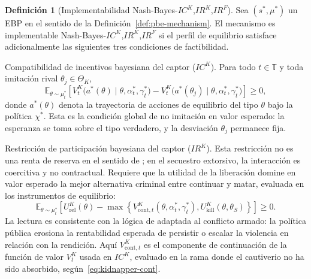 \documentclass[review,authoryear,12pt]{elsarticle}
\providecommand{\textcite}{\citet}
\theoremstyle{plain}
\theoremstyle{definition}
\newtheorem{definition}[theorem]{Definición}
\newcommand{\ThetaK}{\Theta_K}
\newcommand{\1}{\mathbf{1}}
\begin{document}
\begin{definition}[Implementabilidad Nash-Bayes-$IC^K$,$IR^K$,$IR^F$]
\label{def:implementable-mechanism}
Sea $(s^\ast,\mu^\ast)$ un EBP en el sentido de la Definición~\ref{def:pbe-mechanism}. El mecanismo es implementable Nash-Bayes-$IC^K$,$IR^K$,$IR^F$ si el perfil de equilibrio satisface adicionalmente las siguientes tres condiciones de factibilidad.

\smallskip
\noindent Compatibilidad de incentivos bayesiana del captor \textup{(}$IC^K$\textup{)}. Para todo $t\in\mathbb{T}$ y toda imitación rival $\theta_j\in\ThetaK$,
\[
\mathbb{E}_{\theta\sim\mu_t^\ast}
\left[
V^K_t\!\bigl(a^\ast(\theta)\mid \theta,\alpha_t^\ast,\gamma_t^\ast\bigr)
-
V^K_t\!\bigl(a^\ast(\theta_j)\mid \theta,\alpha_t^\ast,\gamma_t^\ast\bigr)
\right]
\ge 0,
\]
donde $a^\ast(\theta)$ denota la trayectoria de acciones de equilibrio del tipo $\theta$ bajo la política $\chi^\ast$. Esta es la condición global de no imitación en valor esperado: la esperanza se toma sobre el tipo verdadero, y la desviación $\theta_j$ permanece fija.

\smallskip
\noindent Restricción de participación bayesiana del captor \textup{(}$IR^K$\textup{)}. Esta restricción no es una renta de reserva en el sentido de \textcite{Myerson1979IC}; en el secuestro extorsivo, la interacción es coercitiva y no contractual. Requiere que la utilidad de la liberación domine en valor esperado la mejor alternativa criminal entre continuar y matar, evaluada en los instrumentos de equilibrio:
\[
\mathbb{E}_{\theta\sim\mu_t^\ast}
\left[
U^K_{\mathrm{rel}}(\theta)
-
\max\left\{
V^K_{\mathrm{cont},t}(\theta,\alpha_t^\ast,\gamma_t^\ast),
U^K_{\mathrm{kill}}(\theta,\theta_S)
\right\}
\right]
\ge0.
\]
La lectura es consistente con la lógica de \textcite{Becker1968} adaptada al conflicto armado: la política pública erosiona la rentabilidad esperada de persistir o escalar la violencia en relación con la rendición. Aquí $V^K_{\mathrm{cont},t}$ es el componente de continuación de la función de valor $V^K_t$ usada en $IC^K$, evaluado en la rama donde el cautiverio no ha sido absorbido, según~\eqref{eq:kidnapper-cont}.


\end{definition}
\end{document}
